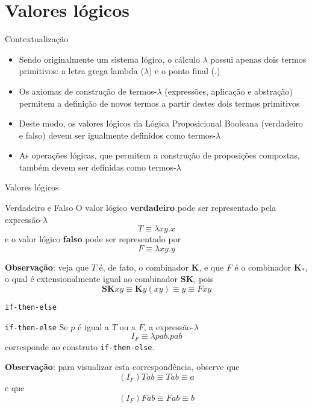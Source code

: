 \section{Valores lógicos}

\begin{frame}[fragile]{Contextualização}

    \begin{itemize}
        \item Sendo originalmente um sistema lógico, o cálculo $\lambda$ possui apenas
            dois termos primitivos: a letra grega lambda ($\lambda$) e o ponto final ($.$)

        \item Os axiomas de construção de termos-$\lambda$ (expressões, aplicação e abstração)
            permitem a definição de novos termos a partir destes dois termos primitivos

        \item Deste modo, os valores lógicos da Lógica Proposicional Booleana (verdadeiro e falso)
            devem ser igualmente definidos como termos-$\lambda$

        \item As operações lógicas, que permitem a construção de proposições compostas, também
            devem ser definidas como termos-$\lambda$
    \end{itemize}

\end{frame}

\begin{frame}[fragile]{Valores lógicos}

    \begin{block}{Verdadeiro e Falso}
        O valor lógico \textbf{verdadeiro} pode ser representado pela expressão-$\lambda$
        \[
            T \equiv \lambda xy.x
        \] e o valor lógico \textbf{falso} pode ser representado por
        \[
            F \equiv \lambda xy.y
        \]
    \end{block}

    \vspace{0.1in}

    \textbf{Observação}: veja que $T$ é, de fato, o combinador $\mathbf{K}$, e que $F$ é o 
    combinador $\mathbf{K_*}$, o qual é extensionalmente igual ao combinador $\mathbf{SK}$, pois
    \[
        \mathbf{SK}xy \equiv \mathbf{K}y(xy) \equiv y \equiv Fxy
    \]
\end{frame}

\begin{frame}[fragile]{\texttt{if-then-else}}

    \begin{block}{\texttt{if-then-else}}
        Se $p$ é igual a $T$ ou a $F$, a expressão-$\lambda$
        \[
            I_F \equiv \lambda pab.pab
        \]
        corresponde ao construto \texttt{if-then-else}. 
    \end{block}

    \vspace{0.1in}

    \textbf{Observação}: para visualizar esta correspondência, observe que
    \[
        (I_F) Tab \equiv Tab \equiv a
    \]
    e que
    \[
        (I_F) Fab \equiv Fab \equiv b
    \]
\end{frame}

